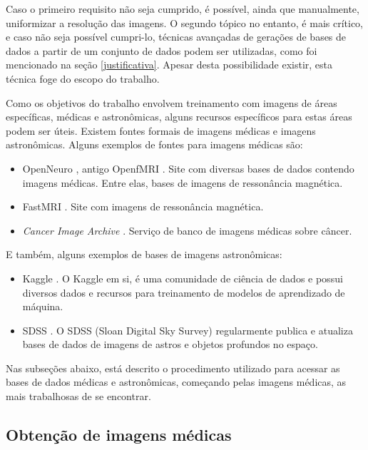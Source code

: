 Caso o primeiro requisito não seja cumprido, é possível, ainda que manualmente, uniformizar a resolução das imagens. O segundo tópico no entanto, é mais crítico, e caso não seja possível cumpri-lo, técnicas avançadas de gerações de bases de dados a partir de um conjunto de dados podem ser utilizadas, como foi mencionado na seção \ref{justificativa}. Apesar desta possibilidade existir, esta técnica foge do escopo do trabalho.

Como os objetivos do trabalho envolvem treinamento com imagens de áreas específicas, médicas e astronômicas, alguns recursos específicos para estas áreas podem ser úteis. Existem fontes formais de imagens médicas e imagens astronômicas. Alguns exemplos de fontes para imagens médicas são:

\begin{itemize}
    \item OpenNeuro \cite{openneuro_openneuro_2022}, antigo OpenfMRI \cite{openfmri_openfmri_2022}. Site com diversas bases de dados contendo imagens médicas. Entre elas, bases de imagens de ressonância magnética.
    \item FastMRI \cite{fastmri_fastmri_2022}. Site com imagens de ressonância magnética.
    \item \textit{Cancer Image Archive} \cite{cancer_imaging_archive_cancer_2022}. Serviço de banco de imagens médicas sobre câncer.
\end{itemize}

E também, alguns exemplos de bases de imagens astronômicas:

\begin{itemize}
    \item Kaggle \cite{srivastava_astronomy_2024}. O Kaggle em si, é uma comunidade de ciência de dados e possui diversos dados e recursos para treinamento de modelos de aprendizado de máquina. 
    \item SDSS \cite{sdss_sloan_2024}. O SDSS (Sloan Digital Sky Survey) regularmente publica e atualiza bases de dados de imagens de astros e objetos profundos no espaço.
\end{itemize}

Nas subseções abaixo, está descrito o procedimento utilizado para acessar as bases de dados médicas e astronômicas, começando pelas imagens médicas, as mais trabalhosas de se encontrar.

\subsection{Obtenção de imagens médicas}
\label{sec:imagens_medicas}

